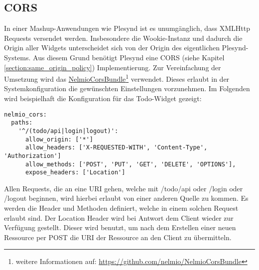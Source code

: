 \subsection{CORS}\label{section:cors_implementierung}
In einer Mashup-Anwendungen wie Plesynd ist es unumgänglich, dass XMLHttp Requests versendet werden. Insbesondere die Wookie-Instanz und dadurch die Origin aller Widgets unterscheidet sich von der Origin des eigentlichen Plesynd-Systems. Aus diesem Grund benötigt Plesynd eine CORS (siehe Kapitel \ref{section:same_origin_policy}) Implementierung. Zur Vereinfachung der Umsetzung wird das \href{https://github.com/nelmio/NelmioCorsBundle}{NelmioCorsBundle}\footnote{weitere Informationen auf: \url{https://github.com/nelmio/NelmioCorsBundle}} verwendet. Dieses erlaubt in der Systemkonfiguration die gewünschten Einstellungen vorzunehmen. Im Folgenden wird beispielhaft die Konfiguration für das Todo-Widget gezeigt: 
\begin{lstlisting}
nelmio_cors:
  paths:
    '^/(todo/api|login|logout)':
      allow_origin: ['*']
      allow_headers: ['X-REQUESTED-WITH', 'Content-Type', 'Authorization']
      allow_methods: ['POST', 'PUT', 'GET', 'DELETE', 'OPTIONS'],
      expose_headers: ['Location']
\end{lstlisting}
Allen Requests, die an eine URI gehen, welche mit /todo/api oder /login oder /logout beginnen, wird hierbei erlaubt von einer anderen Quelle zu kommen. Es werden die Header und Methoden definiert, welche in einem solchen Request erlaubt sind. Der Location Header wird bei Antwort dem Client wieder zur Verfügung gestellt. Dieser wird benutzt, um nach dem Erstellen einer neuen Ressource per POST die URI der Ressource an den Client zu übermitteln. 

